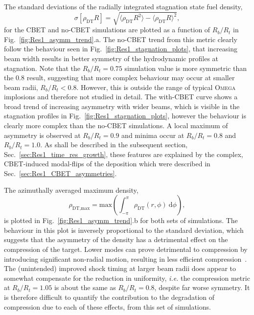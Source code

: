 The standard deviations of the radially integrated stagnation state fuel density,
\begin{equation}
    \sigma [\rho_{\text{DT}}R] = \sqrt{ \langle \rho_{\text{DT}}R^2 \rangle - \langle \rho_{\text{DT}}R \rangle^2 },
\end{equation}
for the \ac{CBET} and no-\ac{CBET} simulations are plotted as a function of $R_b/R_t$ in Fig.~\ref{fig:Res1_asymm_trend}.a.
The no-\ac{CBET} trend from this metric clearly follow the behaviour seen in Fig.~\ref{fig:Res1_stagnation_plots}, that increasing beam width results in better symmetry of the hydrodynamic profiles at stagnation.
Note that the $R_b/R_t=0.75$ simulation value is more symmetric than the $0.8$ result, suggesting that more complex behaviour may occur at smaller beam radii, $R_b/R_t<0.8$.
However, this is outside the range of typical \textsc{Omega} implosions and therefore not studied in detail.
The with-\ac{CBET} curve shows a broad trend of increasing asymmetry with wider beams, which is visible in the stagnation profiles in Fig.~\ref{fig:Res1_stagnation_plots}, however the behaviour is clearly more complex than the no-\ac{CBET} simulations.
A local maximum of asymmetry is observed at $R_b/R_t=0.9$ and minima occur at $R_b/R_t=0.8$ and $R_b/R_t=1.0$.
As shall be described in the subsequent section, Sec.~\ref{sec:Res1_time_res_growth}, these features are explained by the complex, \ac{CBET}-induced modal-flips of the deposition which were described in Sec.~\ref{sec:Res1_CBET_asymmetries}.

The azimuthally averaged maximum density,
\begin{equation}
    \rho_{\text{DT,max}} = \text{max}\left( \int_{-\pi}^{\pi} \rho_{\text{DT}}(r,\phi)\ \text{d}\phi \right),
\end{equation}
is plotted in Fig.~\ref{fig:Res1_asymm_trend}.b for both sets of simulations.
The behaviour in this plot is inversely proportional to the standard deviation, which suggests that the asymmetry of the density has a detrimental effect on the compression of the target.
Lower modes can prove detrimental to compression by introducing significant non-radial motion, resulting in less efficient compression~\cite{bose_physics_2017,bose_analysis_2018}.
The (unintended) improved shock timing at larger beam radii does appear to somewhat compensate for the reduction in uniformity, \textit{i.e.} the compression metric at $R_b/R_t=1.05$ is about the same as $R_b/R_t=0.8$, despite far worse symmetry.
It is therefore difficult to quantify the contribution to the degradation of compression due to each of these effects, from this set of simulations.

